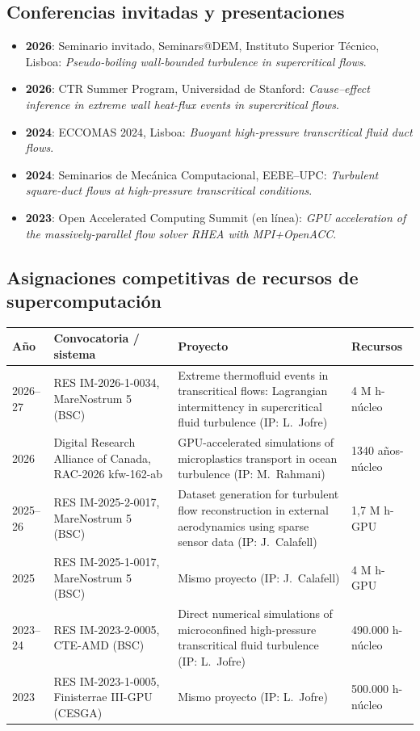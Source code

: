 \documentclass[11pt]{article}
\begin{document}
\subsection{Conferencias invitadas y presentaciones}
\begin{itemize}
  \item \textbf{2026}: Seminario invitado, Seminars@DEM, Instituto Superior T\'ecnico,
  Lisboa: \emph{Pseudo-boiling wall-bounded turbulence in supercritical flows}.
  \item \textbf{2026}: CTR Summer Program, Universidad de Stanford: \emph{Cause--effect
  inference in extreme wall heat-flux events in supercritical flows}. 
  \item \textbf{2024}: ECCOMAS 2024, Lisboa: \emph{Buoyant high-pressure transcritical fluid duct flows}.
  \item \textbf{2024}: Seminarios de Mec\'anica Computacional, EEBE--UPC: \emph{Turbulent
  square-duct flows at high-pressure transcritical conditions}.
  \item \textbf{2023}: Open Accelerated Computing Summit (en l\'inea): \emph{GPU acceleration
  of the massively-parallel flow solver RHEA with MPI+OpenACC}.
\end{itemize}

\subsection{Asignaciones competitivas de recursos de supercomputaci\'on}
\begin{center}\small
\begin{tabularx}{\textwidth}{@{}p{1.4cm}p{3.3cm}Xp{2.4cm}@{}}
\toprule
\textbf{A\~no} & \textbf{Convocatoria / sistema} & \textbf{Proyecto} & \textbf{Recursos} \\
\midrule
2026--27 & RES IM-2026-1-0034, MareNostrum 5 (BSC) & Extreme thermofluid events in transcritical flows: Lagrangian intermittency in supercritical fluid turbulence (IP: L.\ Jofre) & 4 M h-n\'ucleo \\
2026 & Digital Research Alliance of Canada, RAC-2026 kfw-162-ab & GPU-accelerated simulations of microplastics transport in ocean turbulence (IP: M.\ Rahmani) & 1340 a\~nos-n\'ucleo \\
2025--26 & RES IM-2025-2-0017, MareNostrum 5 (BSC) & Dataset generation for turbulent flow reconstruction in external aerodynamics using sparse sensor data (IP: J.\ Calafell) & 1,7 M h-GPU \\
2025 & RES IM-2025-1-0017, MareNostrum 5 (BSC) & Mismo proyecto (IP: J.\ Calafell) & 4 M h-GPU \\
2023--24 & RES IM-2023-2-0005, CTE-AMD (BSC) & Direct numerical simulations of microconfined high-pressure transcritical fluid turbulence (IP: L.\ Jofre) & 490.000 h-n\'ucleo \\
2023 & RES IM-2023-1-0005, Finisterrae III-GPU (CESGA) & Mismo proyecto (IP: L.\ Jofre) & 500.000 h-n\'ucleo \\
\bottomrule
\end{tabularx}
\end{center}
\end{document}
